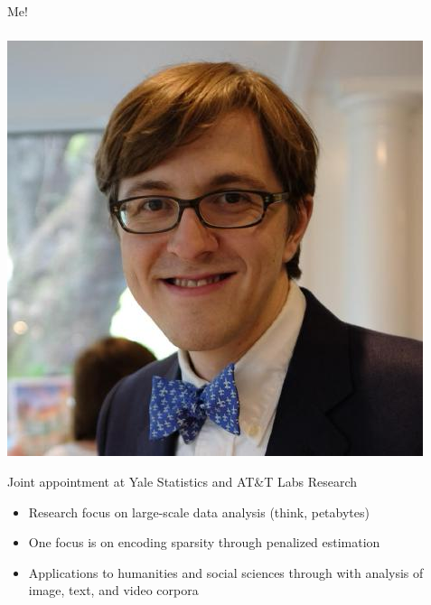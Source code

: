\begin{frame}[fragile] \frametitle{}

\begin{flushright}
{\color{yaleblue}\sc\fontsize{1cm}{0cm}\selectfont Me!}
\end{flushright}

\end{frame}

\begin{frame}[fragile] \frametitle{}

\noindent
\begin{minipage}{0.4\textwidth}
\includegraphics[width=0.9\linewidth]{img/arnold.jpeg}
\end{minipage}%
\begin{minipage}{0.6\textwidth}
Joint appointment at Yale Statistics and AT\&T Labs Research
\begin{itemize}
\item Research focus on large-scale data analysis (think, petabytes)
\item One focus is on encoding sparsity through penalized estimation
\item Applications to humanities and social sciences through with
analysis of image, text, and video corpora
\end{itemize}
\end{minipage}
\end{frame}


